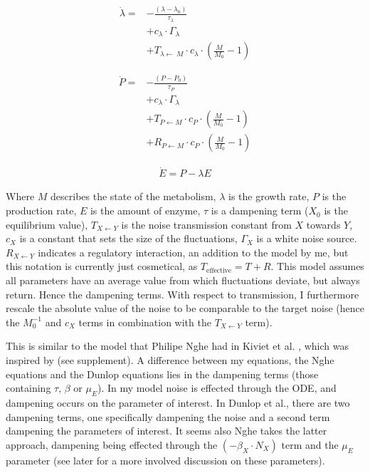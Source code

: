 \documentclass[a4paper,twoside,10pt]{report}
\begin{document}
\begin{align}
	\dot{\lambda} = & -\frac{(\lambda - \lambda_0 )}{\tau_\lambda} \nonumber \\ 
 			& + c_\lambda \cdot \Gamma_\lambda \nonumber \\  %
			& +    T_{\lambda\leftarrow\ M} \cdot c_\lambda \cdot (\frac{M}{M_0}-1) 
\end{align}

\begin{align}
\label{mythirdequation}
\dot{P} = & - \frac{(P-P_0)}{\tau_P} \nonumber \\ 
		 & + c_\lambda \cdot \Gamma_\lambda \nonumber \\ 
         & + T_{P\leftarrow M} \cdot c_P \cdot (\frac{M}{M_0}-1)  \nonumber \\ 
         & + R_{P\leftarrow M} \cdot c_P \cdot (\frac{M}{M_0}-1)
\end{align}

\begin{align}
\label{mylastequation}
\dot{E} = P - \lambda E
\end{align}

Where $M$ describes the state of the metabolism, $\lambda$ is the growth rate, $P$ is the production rate, $E$ is the amount of enzyme, $\tau$ is a dampening term ($X_0$ is the equilibrium value), $T_{X \leftarrow Y}$ is the noise transmission constant from $X$ towards $Y$, $c_X$ is a constant that sets the size of the fluctuations, $\Gamma_X$ is a white noise source.
$R_{X \leftarrow Y}$ indicates a regulatory interaction, an addition to the model by me, but this notation is currently just cosmetical, as $T_\text{effective}=T+R$.
%
This model assumes all parameters have an average value from which fluctuations deviate, but always return. Hence the dampening terms.
With respect to transmission, I furthermore rescale the absolute value of the noise to be comparable to the target noise (hence the $M_0^{-1}$ and $c_X$ terms in combination with the $T_{X\leftarrow Y}$ term).

This is similar to the model that Philipe Nghe had in Kiviet et al. \cite{Kiviet2014}, which was inspired by \cite{Dunlop2008} (see supplement).
%
A difference between my equations, the Nghe equations and the Dunlop equations lies in the dampening terms (those containing $\tau$, $\beta$ or $\mu_E$). In my model noise is effected through the ODE, and dampening occurs on the parameter of interest. In Dunlop et al., there are two dampening terms, one specifically dampening the noise and a second term dampening the parameters of interest. It seems also Nghe takes the latter approach, dampening being effected through the $(-\beta_X \cdot N_X)$ term and the $\mu_E$ parameter (see later for a more involved discussion on these parameters).
\end{document}
